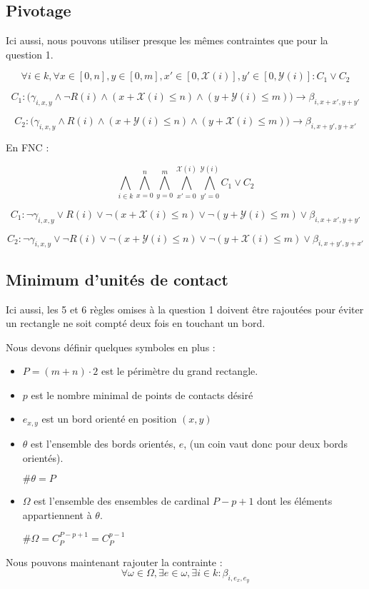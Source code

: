 \documentclass[a4paper]{article}
\begin{document}
\subsection{Pivotage}

Ici aussi, nous pouvons utiliser presque les mêmes contraintes que pour la question 1.

$$
\forall i \in k,
\forall x \in [0, n] , y \in [0, m],
x' \in [0, \mathcal{X}(i)], y' \in [0, \mathcal{Y}(i)] : C_1 \lor C_2
$$

$$
C_1 : \Big(
\gamma_{i, x, y} \land \lnot R(i)
\land (x + \mathcal{X}(i) \leq n)
\land (y + \mathcal{Y}(i) \leq m)
\Big)
\rightarrow \beta_{i, x + x', y + y'}
$$

$$
C_2 : \Big(
\gamma_{i, x, y} \land R(i)
\land (x + \mathcal{Y}(i) \leq n)
\land (y + \mathcal{X}(i) \leq m)
\Big)
\rightarrow \beta_{i, x + y', y + x'}
$$

En FNC :

$$
\bigwedge_{i \in k}
\bigwedge_{x=0}^{n} \bigwedge_{y=0}^{m}
\bigwedge_{x'=0}^{\mathcal{X}(i)} \bigwedge_{y'=0}^{\mathcal{Y}(i)} C_1 \lor C_2
$$

$$
C_1 :
\lnot \gamma_{i, x, y} \lor R(i)
\lor \lnot (x + \mathcal{X}(i) \leq n)
\lor \lnot (y + \mathcal{Y}(i) \leq m)
\lor \beta_{i, x + x', y + y'}
$$

$$
C_2 :
\lnot \gamma_{i, x, y} \lor \lnot R(i)
\lor \lnot (x + \mathcal{Y}(i) \leq n)
\lor \lnot (y + \mathcal{X}(i) \leq m)
\lor \beta_{i, x + y', y + x'}
$$


\subsection{Minimum d'unités de contact}

Ici aussi, les 5 et 6 règles omises à la question 1 doivent être rajoutées pour éviter un rectangle ne soit compté deux fois en touchant un bord.

Nous devons définir quelques symboles en plus :
\begin{itemize}
  \item $P = (m + n) \cdot 2$ est le périmètre du grand rectangle.
  \item $p$ est le nombre minimal de points de contacts désiré
  \item $e_{x,y}$ est un bord orienté en position $(x,y)$
  \item $\theta$ est l'ensemble des bords orientés, $e$,  (un coin vaut donc pour deux bords orientés).

  $\#\theta = P$
  \item $\Omega$ est l'ensemble des ensembles de cardinal $P-p+1$ dont les éléments appartiennent à $\theta$.

  $\#\Omega = C_P^{P-p+1} = C_P^{p-1}$
\end{itemize}
\vspace{1em}
Nous pouvons maintenant rajouter la contrainte : $$
\forall \omega \in \Omega, \exists e \in \omega, \exists i \in k : \beta_{i, e_x, e_y}
$$
\end{document}
